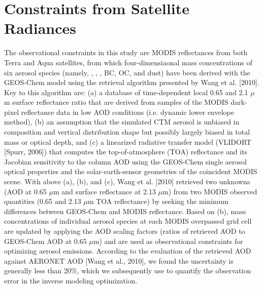 \section{Constraints from Satellite Radiances}

 The observational constraints in this study are 
 MODIS reflectances from both Terra and Aqua satellites, 
 from which four-dimensiaonal mass concentrations of six aerosol species 
 (namely, , , , BC, OC, and dust) have been derived 
 with the GEOS-Chem model using the retrieval algorithm presented by Wang et al. [2010]. 
 Key to this algorithm are: 
 (a) a database of time-dependent local 0.65 and 2.1 $\mu$m surface reflectance ratio 
 that are derived from samples of the MODIS dark-pixel reflectance data in low AOD conditions 
 (i.e. dynamic lower envelope method), 
 (b) an assumption that the simulated CTM aerosol is unbiased 
 in composition and vertical distribution shape but possibly largely biased 
 in total mass or optical depth, 
 and (c) a linearized radiative transfer model (VLIDORT [Spurr, 2006]) 
 that computes the top-of-atmosphere (TOA) reflectance 
 and its Jacobian sensitivity to the column AOD using 
 the GEOS-Chem single aerosol optical properties 
 and the solar-earth-sensor geometries of the coincident MODIS scene. 
 With above (a), (b), and (c), Wang et al. [2010] retrieved two unknowns 
 (AOD at 0.65 $\mu$m and surface reflectance at 2.13 $\mu$m) 
 from two MODIS observed quantities (0.65 and 2.13 $\mu$m TOA reflectance) 
 by seeking the minimum differences between GEOS-Chem and MODIS reflectance. 
 Based on (b), mass concentrations of individual aerosol species 
 at each MODIS overpassed grid cell are updated by applying the AOD scaling factors 
 (ratios of retrieved AOD to GEOS-Chem AOD at 0.65 $\mu$m) 
 and are used as observational constraints for optimizing aerosol emissions. 
 According to the evaluation of the retrieved AOD against AERONET AOD [Wang et al., 2010], 
 we found the uncertainty is generally less than 20\%, 
 which we subsequently use to quantify the observation error 
 in the inverse modeling optimization. 

